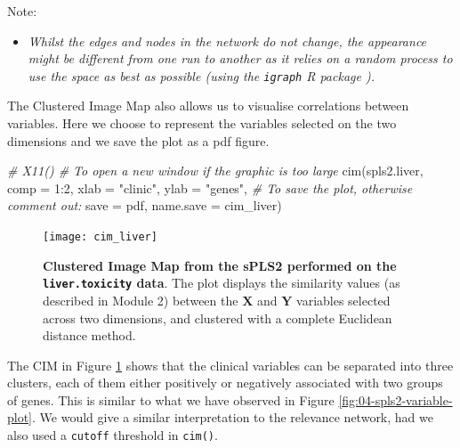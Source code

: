 \documentclass[
]{book}
\newenvironment{Shaded}{\begin{snugshade}}{\end{snugshade}}
\newcommand{\AttributeTok}[1]{\textcolor[rgb]{0.77,0.63,0.00}{#1}}
\newcommand{\CommentTok}[1]{\textcolor[rgb]{0.56,0.35,0.01}{\textit{#1}}}
\newcommand{\DecValTok}[1]{\textcolor[rgb]{0.00,0.00,0.81}{#1}}
\newcommand{\FunctionTok}[1]{\textcolor[rgb]{0.00,0.00,0.00}{#1}}
\newcommand{\NormalTok}[1]{#1}
\newcommand{\SpecialCharTok}[1]{\textcolor[rgb]{0.00,0.00,0.00}{#1}}
\newcommand{\StringTok}[1]{\textcolor[rgb]{0.31,0.60,0.02}{#1}}
\providecommand{\tightlist}{%
  \setlength{\itemsep}{0pt}\setlength{\parskip}{0pt}}
\begin{document}
Note:

\begin{itemize}
\tightlist
\item
  \emph{Whilst the edges and nodes in the network do not change, the appearance might be different from one run to another as it relies on a random process to use the space as best as possible (using the \texttt{igraph} R package \citet{csa06}).}
\end{itemize}

The Clustered Image Map also allows us to visualise correlations between variables. Here we choose to represent the variables selected on the two dimensions and we save the plot as a pdf figure.

\begin{Shaded}
\begin{Highlighting}[]
\CommentTok{\# X11()  \# To open a new window if the graphic is too large}
\FunctionTok{cim}\NormalTok{(spls2.liver, }\AttributeTok{comp =} \DecValTok{1}\SpecialCharTok{:}\DecValTok{2}\NormalTok{, }\AttributeTok{xlab =} \StringTok{"clinic"}\NormalTok{, }\AttributeTok{ylab =} \StringTok{"genes"}\NormalTok{,}
    \CommentTok{\# To save the plot, otherwise comment out:}
    \AttributeTok{save =} \StringTok{\textquotesingle{}pdf\textquotesingle{}}\NormalTok{, }\AttributeTok{name.save =} \StringTok{\textquotesingle{}cim\_liver\textquotesingle{}}\NormalTok{)}
\end{Highlighting}
\end{Shaded}

\begin{figure}

{\centering \texttt{[image: cim\_liver]} 

}

\caption{\textbf{Clustered Image Map from the sPLS2 performed on the \texttt{liver.toxicity} data}. The plot displays the similarity values (as described in Module 2) between the \(\boldsymbol X\) and \(\boldsymbol Y\) variables selected across two dimensions, and clustered with a complete Euclidean distance method.}\label{fig:04-spls2-cim2}
\end{figure}



The CIM in Figure \ref{fig:04-spls2-cim2} shows that the clinical variables can be separated into three clusters, each of them either positively or negatively associated with two groups of genes. This is similar to what we have observed in Figure \ref{fig:04-spls2-variable-plot}. We would give a similar interpretation to the relevance network, had we also used a \texttt{cutoff} threshold in \texttt{cim()}.
\end{document}
